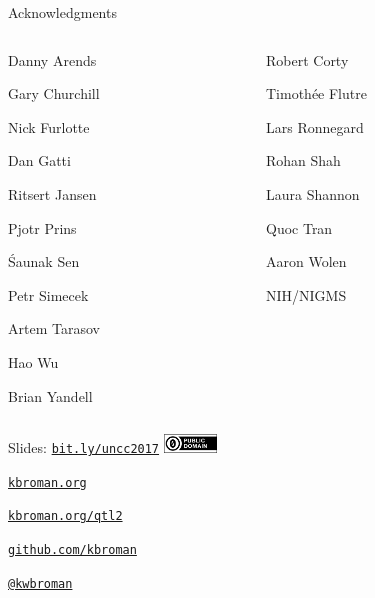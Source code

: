 \documentclass[12pt,t]{beamer}
\begin{document}
\begin{frame}[c]{Acknowledgments}

\begin{columns}[T]
  \begin{column}[T]{0.5\textwidth}
    \vspace{0pt}
\bi
\item[] Danny Arends
\item[] Gary Churchill
\item[] Nick Furlotte
\item[] Dan Gatti
\item[] Ritsert Jansen
\item[] Pjotr Prins
\item[] \'Saunak Sen
\item[] Petr Simecek
\item[] Artem Tarasov
\item[] Hao Wu
\item[] Brian Yandell
  \ei
  \end{column} \hfill
\begin{column}[T]{0.5\textwidth}
\vspace*{0mm}

  \bi
\item[] Robert Corty
\item[] Timoth\'ee Flutre
\item[] Lars Ronnegard
\item[] Rohan Shah
\item[] Laura Shannon
\item[] Quoc Tran
\item[] Aaron Wolen
\item[]
\item[] NIH/NIGMS
  \ei
\end{column}
\end{columns}

\end{frame}


\begin{frame}[c]{}

\Large

Slides: \href{http://bit.ly/uncc2017}{\tt bit.ly/uncc2017} \quad
\includegraphics[height=5mm]{Figs/cc-zero.png}

\vspace{7mm}

\href{http://kbroman.org}{\tt \lolit kbroman.org}

\vspace{7mm}

\href{http://kbroman.org/qtl2}{\tt kbroman.org/qtl2}

\vspace{7mm}

\href{https://github.com/kbroman}{\tt \lolit github.com/kbroman}

\vspace{7mm}

\href{https://twitter.com/kwbroman}{\tt \lolit @kwbroman}


\end{frame}
\end{document}
